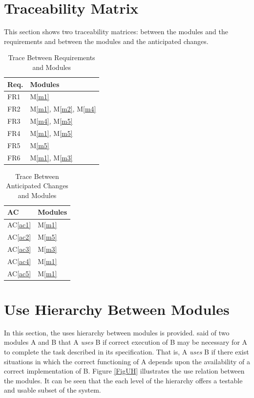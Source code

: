 \documentclass[12pt, titlepage]{article}
\newcommand{\acref}[1]{AC\ref{#1}}
\newcommand{\mref}[1]{M\ref{#1}}
\begin{document}
\section{Traceability Matrix} \label{SecTM}

This section shows two traceability matrices: between the modules and the
requirements and between the modules and the anticipated changes.

\begin{table}[H]
\centering
\begin{tabular}{p{} p{}}
\toprule
\textbf{Req.} & \textbf{Modules}\\
\midrule
FR1 & \mref{m1}\\
FR2 & \mref{m1}, \mref{m2}, \mref{m4}\\
FR3 & \mref{m4}, \mref{m5}\\
FR4 & \mref{m1}, \mref{m5}\\
FR5 & \mref{m5}\\
FR6 & \mref{m1}, \mref{m3}\\
\bottomrule
\end{tabular}
\caption{Trace Between Requirements and Modules}
\label{TblRT}
\end{table}

\begin{table}[H]
\centering
\begin{tabular}{p{} p{}}
\toprule
\textbf{AC} & \textbf{Modules}\\
\midrule
\acref{ac1} & \mref{m1}\\
\acref{ac2} & \mref{m5}\\
\acref{ac3} & \mref{m3}\\
\acref{ac4} & \mref{m1}\\
\acref{ac5} & \mref{m1}\\
\bottomrule
\end{tabular}
\caption{Trace Between Anticipated Changes and Modules}
\label{TblACT}
\end{table}

\section{Use Hierarchy Between Modules} \label{SecUse}

In this section, the uses hierarchy between modules is
provided. \citet{Parnas1978} said of two modules A and B that A {\em uses} B if
correct execution of B may be necessary for A to complete the task described in
its specification. That is, A {\em uses} B if there exist situations in which
the correct functioning of A depends upon the availability of a correct
implementation of B.  Figure \ref{FigUH} illustrates the use relation between
the modules. It can be seen that the each level of the hierarchy offers a testable
and usable subset of the system.
\end{document}
